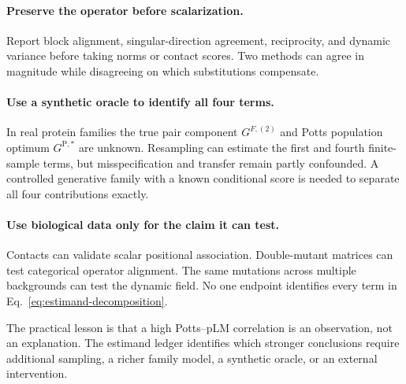 \paragraph{Preserve the operator before scalarization.}
Report block alignment, singular-direction agreement, reciprocity, and dynamic variance before
taking norms or contact scores.  Two methods can agree in magnitude while disagreeing on which
substitutions compensate.

\paragraph{Use a synthetic oracle to identify all four terms.}
In real protein families the true pair component $G^{F,(2)}$ and Potts population optimum
$G^{\mathrm{P},*}$ are unknown.  Resampling can estimate the first and fourth finite-sample terms,
but misspecification and transfer remain partly confounded.  A controlled generative family with a
known conditional score is needed to separate all four contributions exactly.

\paragraph{Use biological data only for the claim it can test.}
Contacts can validate scalar positional association.  Double-mutant matrices can test categorical
operator alignment.  The same mutations across multiple backgrounds can test the dynamic field.
No one endpoint identifies every term in Eq.~\ref{eq:estimand-decomposition}.

The practical lesson is that a high Potts--pLM correlation is an observation, not an explanation.
The estimand ledger identifies which stronger conclusions require additional sampling, a richer
family model, a synthetic oracle, or an external intervention.

